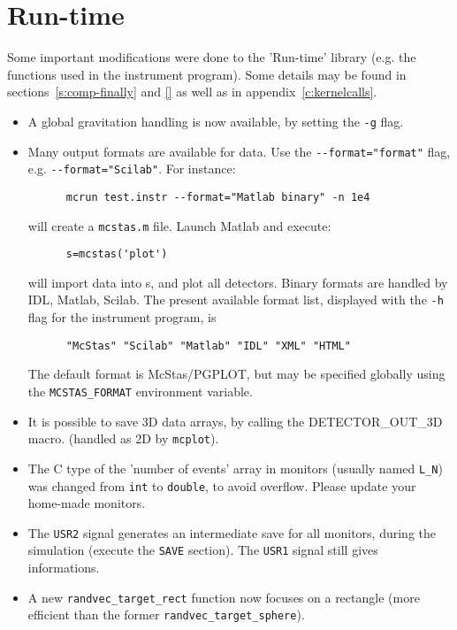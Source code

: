 \section{Run-time} 
\label{s:new-features:run-time}

Some important modifications were done to the 'Run-time' library (e.g. the functions used in the instrument program). Some details may be found in sections~\ref{s:comp-finally} and \ref{} as well as in appendix~\ref{c:kernelcalls}.

\begin{itemize}
\item A global gravitation handling is now available, by setting the \verb+-g+ flag.
\item Many output formats are available for data. Use the \verb+--format="format"+
    flag, e.g. \verb+--format="Scilab"+. For instance:
    \begin{verbatim}
      mcrun test.instr --format="Matlab binary" -n 1e4
    \end{verbatim}
    will create a \verb+mcstas.m+ file. Launch Matlab and execute:
    \begin{verbatim}
      s=mcstas('plot')
    \end{verbatim}
    will import data into s, and plot all detectors.
    Binary formats are handled by IDL, Matlab, Scilab.
    The present available format list, displayed with
    the \verb+-h+ flag for the instrument program, is
    \begin{verbatim}
      "McStas" "Scilab" "Matlab" "IDL" "XML" "HTML" 
    \end{verbatim}
    The default format is McStas/PGPLOT, but may be specified globally using
    the \verb+MCSTAS_FORMAT+ environment variable. 
     
\item It is possible to save 3D data arrays, by calling the DETECTOR\_OUT\_3D macro.
    (handled as 2D by \verb+mcplot+). 
\item The C type of the 'number of events' array in monitors (usually named
    \verb+L_N+) was changed from \verb+int+ to \verb+double+, to avoid overflow.
    Please update your home-made monitors.
\item The \verb+USR2+ signal generates an intermediate save for all monitors, during
    the simulation (execute the \texttt{SAVE} section). The \verb+USR1+ signal still
    gives informations. 
\item A new \verb+randvec_target_rect+ function now focuses on a rectangle (more
    efficient than the former \verb+randvec_target_sphere+).
\end{itemize}


